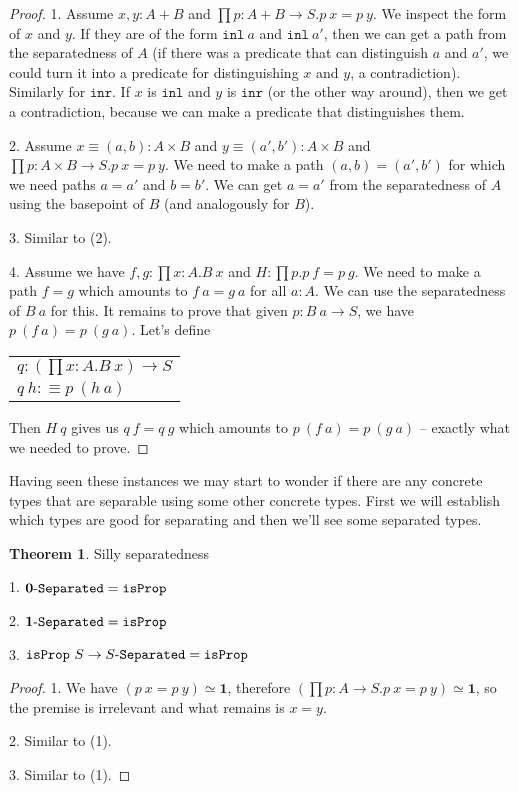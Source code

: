 \documentclass[11pt]{article}
\theoremstyle{definition}
\newtheorem{theorem}{Theorem}[section]
\newcommand{\txt}[1]{\texttt{#1}}
\newcommand{\text}[1]{\texttt{#1}}
\renewcommand{\(}{\left(}
\renewcommand{\)}{\right)}
\newcommand{\defn}{:\equiv}
\newcommand{\isProp}{\text{isProp}}
\newcommand{\apl}[2]{#1\ #2}
\newcommand{\hequiv}[2]{#1 \simeq #2}
\newcommand{\Empty}{\mathbf{0}}
\newcommand{\Unit}{\mathbf{1}}
\newcommand{\dprod}[2]{\prod #1.#2}
\newcommand{\prodt}[2]{#1 \times #2}
\newcommand{\inl}{\txt{inl}}
\newcommand{\inr}{\txt{inr}}
\begin{document}
\begin{proof}
1. Assume $x, y : A + B$ and $\dprod{p : A + B \to S}{\apl{p}{x} = \apl{p}{y}}$. We inspect the form of $x$ and $y$. If they are of the form $\apl{\inl}{a}$ and $\apl{\inl}{a'}$, then we can get a path from the separatedness of $A$ (if there was a predicate that can distinguish $a$ and $a'$, we could turn it into a predicate for distinguishing $x$ and $y$, a contradiction). Similarly for $\inr$. If $x$ is $\inl$ and $y$ is $\inr$ (or the other way around), then we get a contradiction, because we can make a predicate that distinguishes them.

2. Assume $x \equiv (a, b) : \prodt{A}{B}$ and $y \equiv (a', b') : \prodt{A}{B}$ and $\dprod{p : \prodt{A}{B} \to S}{\apl{p}{x} = \apl{p}{y}}$. We need to make a path $(a, b) = (a', b')$ for which we need paths $a = a'$ and $b = b'$. We can get $a = a'$ from the separatedness of $A$ using the basepoint of $B$ (and analogously for $B$).

3. Similar to (2).

4. Assume we have $f, g : \dprod{x : A}{\apl{B}{x}}$ and $H : \dprod{p}{\apl{p}{f} = \apl{p}{g}}$. We need to make a path $f = g$ which amounts to $\apl{f}{a} = \apl{g}{a}$ for all $a : A$. We can use the separatedness of $\apl{B}{a}$ for this. It remains to prove that given $p : \apl{B}{a} \to S$, we have $\apl{p}{(\apl{f}{a})} = \apl{p}{(\apl{g}{a})}$. Let's define \\

\begin{center}
\begin{tabular}{l}
$q : \(\dprod{x : A}{\apl{B}{x}}\) \to S$ \\
$\apl{q}{h} \defn \apl{p}{(\apl{h}{a})}$
\end{tabular}
\end{center}

Then $\apl{H}{q}$ gives us $\apl{q}{f} = \apl{q}{g}$ which amounts to $\apl{p}{(\apl{f}{a})} = \apl{p}{(\apl{g}{a})}$ -- exactly what we needed to prove.
\end{proof}

Having seen these instances we may start to wonder if there are any concrete types that are separable using some other concrete types. First we will establish which types are good for separating and then we'll see some separated types.

\begin{theorem} Silly separatedness

1. $\Separated{\Empty} = \isProp$

2. $\Separated{\Unit} = \isProp$

3. $\apl{\isProp}{S} \to \Separated{S} = \isProp$

\end{theorem}
\begin{proof}
1. We have $\hequiv{(\apl{p}{x} = \apl{p}{y})}{\Unit}$, therefore $\hequiv{(\dprod{p : A \to S}{\apl{p}{x} = \apl{p}{y}})}{\Unit}$, so the premise is irrelevant and what remains is $x = y$.

2. Similar to (1).

3. Similar to (1).
\end{proof}
\end{document}
